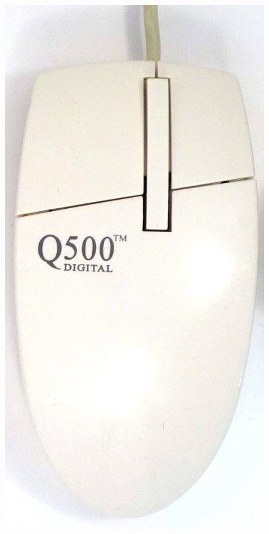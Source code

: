 \documentclass[11pt, a4paper]{article}
\begin{document}
\begin{figure}[h]
    \centering
    \includegraphics[scale=0.5]{1996_q500_mouse/top_30.jpg}

\end{figure}
\end{document}

